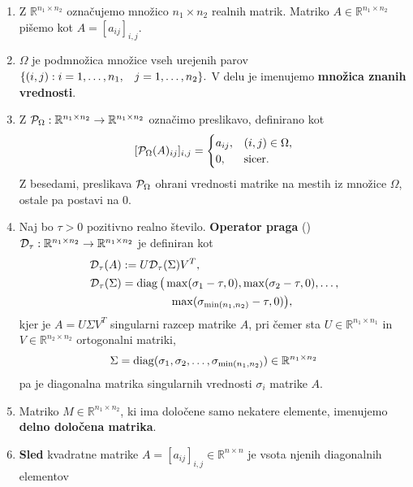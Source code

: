 \begin{enumerate}
  \item Z $\mathbb{R}^{n_1\times n_2}$ označujemo množico $n_1\times n_2$ realnih matrik. Matriko $A\in \mathbb{R}^{n_1\times n_2}$ pišemo kot $A=[a_{ij}]_{i,j}$.
  \item $\Omega$ je podmnožica množice vseh urejenih parov $\{ (i, j) : i = 1, \hdots , n_1, \hspace{0.3cm} j = 1, \hdots, n_2 \}.$ V delu je imenujemo \textbf{množica znanih vrednosti}.
  \item
        Z $\mathcal{P}_\Omega:\mathbb{R}^{n_1\times n_2}\to \mathbb{R}^{n_1\times n_2}$
        označimo preslikavo, definirano kot
        \[ [\mathcal{P}_\Omega(A)_{ij}]_{i,j} = \begin{cases}
            a_{ij}, & (i, j) \in \Omega, \\
            0,      & \text{sicer}.
          \end{cases}
        \]
        Z besedami, preslikava $\mathcal{P}_\Omega$ ohrani vrednosti matrike na mestih iz množice $\Omega$, ostale pa postavi na 0.
  \item Naj bo $\tau > 0$ pozitivno realno število. 
  \textbf{Operator praga} (\cite{CCS}) $\mathcal{D}_\tau: \mathbb{R}^{n_1 \times n_2} \rightarrow \mathbb{R}^{n_1 \times n_2}$ je definiran kot
        \begin{align}
          \label{1007-1959}
          \begin{split}
          \mathcal{D}_\tau(A) &:= U \mathcal{D}_\tau(\Sigma) V^T, \\ \mathcal{D}_\tau(\Sigma) &= \operatorname{diag}\big(\max(\sigma_1 - \tau, 0),
          \max(\sigma_2-\tau,0),\ldots,\\
          &\hspace{1.5cm}
          \max(\sigma_{\min(n_1,n_2)}-\tau,0)\big),
          \end{split}
        \end{align}
    kjer je $A=U\Sigma V^T$
    singularni razcep matrike $A$, pri čemer sta $U\in \mathbb{R}^{n_1\times n_1}$
    in $V\in \mathbb R^{n_2\times n_2}$ ortogonalni matriki,
    $$\Sigma=\operatorname{diag}(\sigma_1,\sigma_2,\ldots,\sigma_{\min(n_1,n_2)})\in \mathbb R^{n_1\times n_2}$$ pa je diagonalna matrika singularnih vrednosti $\sigma_i$ matrike $A$.
  \item Matriko $M \in \mathbb{R}^{n_1 \times n_2}$, ki ima določene samo nekatere elemente, imenujemo \textbf{delno določena matrika}.
  \item \textbf{Sled} kvadratne  matrike $A=[a_{ij}]_{i,j}\in \mathbb R^{n\times n}$ je vsota njenih diagonalnih elementov

\end{enumerate}
